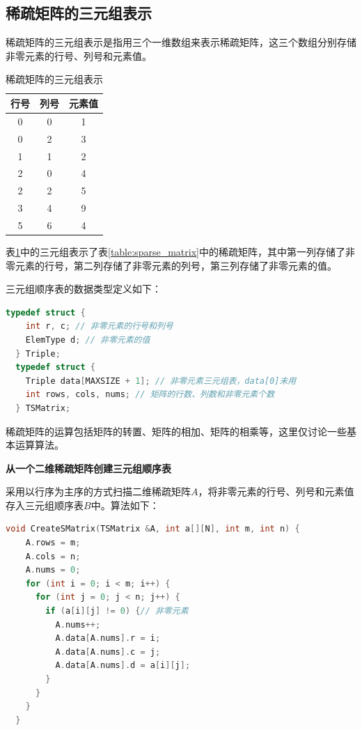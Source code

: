 \documentclass[lang=cn,newtx,10pt,scheme=chinese]{../elegantbook}
\begin{document}
\subsection{稀疏矩阵的三元组表示}

稀疏矩阵的三元组表示是指用三个一维数组来表示稀疏矩阵，这三个数组分别存储非零元素的行号、列号和元素值。


\begin{table}[htbp]
  \centering
  \caption{稀疏矩阵的三元组表示}
  \begin{tabular}{|c|c|c|}
    \hline
    行号 & 列号 & 元素值 \\
    \hline
    0 & 0 & 1 \\
    0 & 2 & 3 \\
    1 & 1 & 2 \\
    2 & 0 & 4 \\
    2 & 2 & 5 \\
    3 & 4 & 9 \\
    5 & 6 & 4 \\
    \hline
  \end{tabular}
  \label{table:sparse_matrix_triplet}
\end{table}

表\ref{table:sparse_matrix_triplet}中的三元组表示了表\ref{table:sparse_matrix}中的稀疏矩阵，其中第一列存储了非零元素的行号，第二列存储了非零元素的列号，第三列存储了非零元素的值。

三元组顺序表的数据类型定义如下：

\begin{lstlisting}[language=C++, caption={三元组顺序表的数据类型定义}]
  typedef struct {
    int r, c; // 非零元素的行号和列号
    ElemType d; // 非零元素的值
  } Triple;
  typedef struct {
    Triple data[MAXSIZE + 1]; // 非零元素三元组表，data[0]未用
    int rows, cols, nums; // 矩阵的行数、列数和非零元素个数
  } TSMatrix;
\end{lstlisting}


稀疏矩阵的运算包括矩阵的转置、矩阵的相加、矩阵的相乘等，这里仅讨论一些基本运算算法。

\textbf{从一个二维稀疏矩阵创建三元组顺序表}

采用以行序为主序的方式扫描二维稀疏矩阵$A$，将非零元素的行号、列号和元素值存入三元组顺序表$B$中。算法如下：

\begin{lstlisting}[language=C++, caption={从一个二维稀疏矩阵创建三元组顺序表}]
  void CreateSMatrix(TSMatrix &A, int a[][N], int m, int n) {
    A.rows = m;
    A.cols = n;
    A.nums = 0;
    for (int i = 0; i < m; i++) {
      for (int j = 0; j < n; j++) {
        if (a[i][j] != 0) {// 非零元素
          A.nums++;
          A.data[A.nums].r = i;
          A.data[A.nums].c = j;
          A.data[A.nums].d = a[i][j];
        }
      }
    }
  }
\end{lstlisting}
\end{document}
